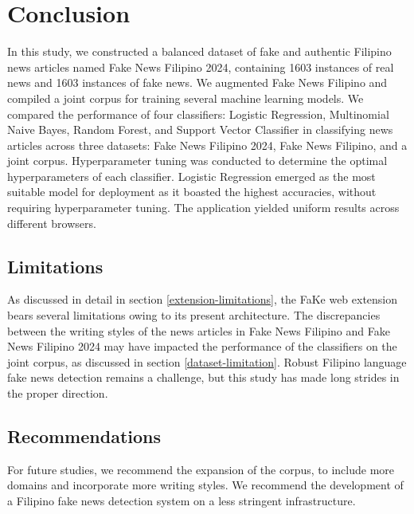 \chapter{Conclusion}

In this study, we constructed a balanced dataset of fake and authentic Filipino news articles named Fake News Filipino 2024, containing 1603 instances of real news and 1603 instances of fake news. We augmented Fake News Filipino and compiled a joint corpus for training several machine learning models. We compared the performance of four classifiers: Logistic Regression, Multinomial Naive Bayes, Random Forest, and Support Vector Classifier in classifying news articles across three datasets: Fake News Filipino 2024, Fake News Filipino, and a joint corpus. Hyperparameter tuning was conducted to determine the optimal hyperparameters of each classifier. Logistic Regression emerged as the most suitable model for deployment as it boasted the highest accuracies, without requiring hyperparameter tuning. The application yielded uniform results across different browsers.

\section{Limitations}

As discussed in detail in section \ref{extension-limitations}, the FaKe web extension bears several limitations owing to its present architecture. The discrepancies between the writing styles of the news articles in Fake News Filipino and Fake News Filipino 2024 may have impacted the performance of the classifiers on the joint corpus, as discussed in section \ref{dataset-limitation}. Robust Filipino language fake news detection remains a challenge, but this study has made long strides in the proper direction.

\section{Recommendations}

For future studies, we recommend the expansion of the corpus, to include more domains and incorporate more writing styles. We recommend the development of a Filipino fake news detection system on a less stringent infrastructure. 
